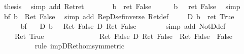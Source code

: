 \begin{isabellebody}
\ {\isacharquery}thesis\ \isamarkupfalse%
\ {\isacharparenleft}simp\ add{\isacharcolon}\ Ret{\isacharunderscore}ret{\isacharparenright}\isanewline
\ \ \isamarkupfalse%
\isanewline
\isamarkupfalse%
\isanewline
\ \ \isamarkupfalse%
\ {\isachardoublequote}{\isasymDown}\ b\ {\isacharequal}\ ret\ False{\isachardoublequote}\isanewline
\ \ \isamarkupfalse%
\ {\isachardoublequote}{\isasymUp}\ {\isacharparenleft}{\isasymDown}\ b{\isacharparenright}\ {\isacharequal}\ {\isasymUp}\ {\isacharparenleft}ret\ False{\isacharparenright}{\isachardoublequote}\ \isamarkupfalse%
\ simp\isanewline
\ \ \isamarkupfalse%
\ bf{\isacharcolon}\ {\isachardoublequote}b\ {\isacharequal}\ Ret\ False{\isachardoublequote}\ \isamarkupfalse%
\ {\isacharparenleft}simp\ add{\isacharcolon}\ Rep{\isacharunderscore}Dsef{\isacharunderscore}inverse\ Ret{\isacharunderscore}def{\isacharparenright}\isanewline
\ \ \isamarkupfalse%
\ {\isachardoublequote}{\isasymDown}\ {\isacharparenleft}{\isasymnot}\isactrlsub D\ b{\isacharparenright}\ {\isacharequal}\ ret\ True{\isachardoublequote}\isanewline
\ \ \isamarkupfalse%
\ {\isacharminus}\isanewline
\ \ \ \ \isamarkupfalse%
\ bf\ \isamarkupfalse%
\ {\isachardoublequote}{\isasymDown}\ {\isacharparenleft}{\isasymnot}\isactrlsub D\ b{\isacharparenright}\ {\isacharequal}\ {\isasymDown}\ {\isacharparenleft}Ret\ False\ {\isasymlongrightarrow}\isactrlsub D\ Ret\ False{\isacharparenright}{\isachardoublequote}\isanewline
\ \ \ \ \ \ \isamarkupfalse%
\ {\isacharparenleft}simp\ add{\isacharcolon}\ NotD{\isacharunderscore}def{\isacharparenright}\isanewline
\ \ \ \ \isamarkupfalse%
\ \isamarkupfalse%
\ {\isachardoublequote}{\isasymdots}\ {\isacharequal}\ {\isasymDown}\ {\isacharparenleft}Ret\ True{\isacharparenright}{\isachardoublequote}\ \isanewline
\ \ \ \ \isamarkupfalse%
\ {\isacharminus}\isanewline
\ \ \ \ \ \ \isamarkupfalse%
\ {\isachardoublequote}{\isacharparenleft}Ret\ False\ {\isasymlongrightarrow}\isactrlsub D\ Ret\ False{\isacharparenright}\ {\isacharequal}\ Ret\ {\isacharparenleft}False\ {\isasymlongrightarrow}\ False{\isacharparenright}{\isachardoublequote}\isanewline
\ \ \ \ \ \ \ \ \isamarkupfalse%
\ {\isacharparenleft}rule\ impD{\isacharunderscore}Ret{\isacharunderscore}hom{\isacharbrackleft}symmetric{\isacharbrackright}{\isacharparenright}\isanewline

\end{isabellebody}
